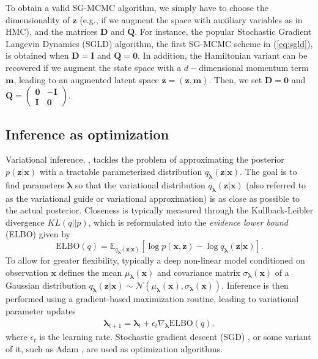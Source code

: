 To obtain a valid SG-MCMC algorithm, we simply have to choose the dimensionality of $\bm{z}$ (e.g., if we augment the space with auxiliary variables as in HMC), and the matrices $\mathbf{D}$ and $\mathbf{Q}$. For instance, the popular Stochastic Gradient Langevin Dynamics (SGLD) algorithm, the first SG-MCMC scheme in (\ref{eq:sgld}), is obtained when $\mathbf{D} = \mathbf{I}$ and $\mathbf{Q} = \mathbf{0}$. In addition, the Hamiltonian variant can be recovered if we augment the state space with a $d-$dimensional momentum term $\mathbf{m}$, leading to an augmented latent space $ \bar{\bm{z}} = (\bm{z}, \mathbf{m})$. Then, we set $\mathbf{D} = \mathbf{0}$ and $\mathbf{Q} = \begin{pmatrix}
\mathbf{0} & -\mathbf{I} \\
\mathbf{I} & \mathbf{0}
\end{pmatrix}$.


\subsection{Inference as optimization}\label{sec:iasopt}


Variational inference, \cite{kucukelbir2017automatic}, tackles the problem of approximating the posterior $p(\bm{z} | \bm{x})$ with a tractable parameterized distribution $q_{\bm{\lambda}}(\bm{z}|\bm{x})$. The goal is to find parameters $\bm{\lambda}$ so that the variational distribution $q_{\bm{\lambda}}(\bm{z}|\bm{x})$ (also referred to as the variational guide or variational approximation) is as close as possible to the actual posterior. Closeness is typically measured through the
Kullback-Leibler 
divergence $KL(q || p)$, which is reformulated into the \emph{evidence lower bound} (ELBO) given by
\begin{equation}\label{eq:elbo}
\mbox{ELBO}(q) = \mathbb{E}_{q_{\bm{\lambda}}(\bm{z}|\bm{x})} \left[ \log p(\bm{x},\bm{z}) - \log q_{\bm{\lambda}}(\bm{z}|\bm{x})\right].
\end{equation}
To allow 
for greater flexibility, typically a deep non-linear model conditioned on observation $\bm{x}$ defines the mean $\mu_{\bm{\lambda}}(\bm{x})$ and covariance matrix $\sigma_{\bm{\lambda}}(\bm{x})$ of a
Gaussian distribution $q_{\bm{\lambda}}(\bm{z}|\bm{x}) \sim \mathcal{N}(\mu_{\bm{\lambda}}(\bm{x}), \sigma_{\bm{\lambda}}(\bm{x}))$.
Inference is then performed using a gradient-based maximization routine, leading to variational parameter updates
\begin{align*}
\bm{\lambda}_{t+1} = \bm{\lambda}_t +  \epsilon_t \nabla_{\bm{\lambda}} \mbox{ELBO}(q),
\end{align*}
where $\epsilon_t$ is the learning rate. Stochastic gradient descent (SGD) \cite{hoffman2013stochastic}, or some variant of it, such as Adam \cite{kingma2014adam}, are used as optimization algorithms.


